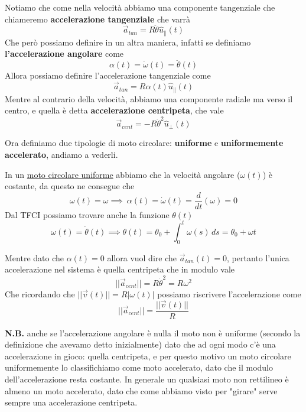 \documentclass{rapport}
\begin{document}
\begin{figure}[htbp]
\end{figure}
Notiamo che come nella velocità abbiamo una componente tangenziale che chiameremo \textbf{accelerazione tangenziale} che varrà
\[
\vec{a}_{tan} = R\ddot{\theta}\hat{u}_\parallel(t)
\]
Che però possiamo definire in un altra maniera, infatti se definiamo \textbf{l'accelerazione angolare} come 
\[
\alpha(t) = \dot{\omega}(t) = \ddot{\theta}(t)
\]
Allora possiamo definire l'accelerazione tangenziale come
\[
\vec{a}_{tan} = R\alpha(t)\hat{u}_\parallel(t)
\]
Mentre al contrario della velocità, abbiamo una componente radiale ma verso il centro, e quella è detta \textbf{accelerazione centripeta}, che vale
\[
\vec{a}_{cent} = -R\dot{\theta}^2\hat{u}_\perp(t)
\]


Ora definiamo due tipologie di moto circolare: \textbf{uniforme} e \textbf{uniformemente accelerato}, andiamo a vederli.

In un \underline{moto circolare uniforme} abbiamo che la velocità angolare ($\omega(t)$) è costante, da questo ne consegue che 
\[
\omega(t) = \omega  \implies \ \alpha(t) = \dot{\omega}(t) = \dfrac{d}{dt}(\omega) = 0
\] 
Dal TFCI possiamo trovare anche la funzione $\theta(t)$
\[
\omega(t) = \dot{\theta}(t) \implies \theta(t) = \theta_0 + \int_{0}^{t} \omega(s)\,ds =  \theta_0 + \omega t 
\]

Mentre dato che $\alpha(t)=0$ allora vuol dire che $\vec{a}_{tan}(t)=0$, pertanto l'unica accelerazione nel sistema è quella centripeta che in modulo vale 
\[
||\vec{a}_{cent}|| = R\dot{\theta}^2 = R\omega^2
\]
Che ricordando che $||\vec{v}(t)|| = R|\omega(t)|$ possiamo riscrivere l'accelerazione come
\[
||\vec{a}_{cent}|| =\dfrac{||\vec{v}(t)||}{R} 
\]

\textbf{N.B.} anche se l'accelerazione angolare è nulla il moto non è uniforme (secondo la definizione che avevamo detto inizialmente) dato che ad ogni modo c'è una accelerazione in gioco: quella centripeta, e per questo motivo un moto circolare uniformemente lo classifichiamo come moto accelerato, dato che il modulo dell'accelerazione resta costante.  In generale un qualsiasi moto non rettilineo è almeno un moto accelerato, dato che come abbiamo visto per "girare" serve sempre una accelerazione centripeta.  
\end{document}
